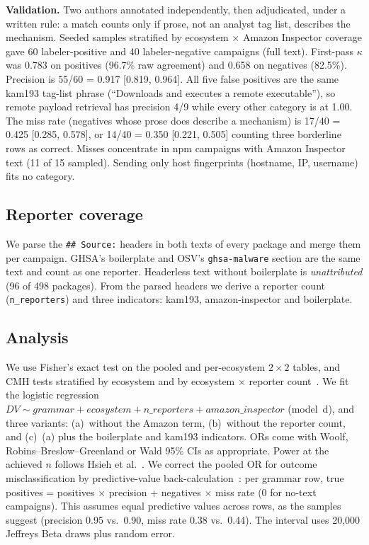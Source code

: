 \documentclass[10pt,conference]{IEEEtran}
\begin{document}
\textbf{Validation.} Two authors annotated independently, then adjudicated,
under a written rule: a match counts only if prose, not an analyst tag
list, describes the mechanism. Seeded samples stratified by ecosystem
$\times$ Amazon Inspector coverage gave 60 labeler-positive and 40
labeler-negative campaigns (full text). First-pass $\kappa$ was 0.783 on
positives (96.7\% raw agreement) and 0.658 on negatives (82.5\%). Precision is 55/60 = 0.917 [0.819, 0.964]. All five
false positives are the same kam193 tag-list phrase (``Downloads and
executes a remote executable''), so remote payload retrieval has precision
4/9 while every other category is at 1.00. The miss rate (negatives whose prose
does describe a mechanism) is 17/40 = 0.425 [0.285, 0.578], or 14/40 =
0.350 [0.221, 0.505] counting three borderline rows as correct. Misses
concentrate in npm campaigns with Amazon Inspector text (11 of 15 sampled).
Sending only host fingerprints (hostname, IP, username) fits no category.

\subsection{Reporter coverage}
We parse the \texttt{\#\# Source:} headers in both texts of every package
and merge them per campaign. GHSA's boilerplate and OSV's
\texttt{ghsa-malware} section are the same text and count as one reporter.
Headerless text without boilerplate is \emph{unattributed} (96 of 498
packages). From the parsed headers we derive a reporter count
(\texttt{n\_reporters}) and three indicators: kam193, amazon-inspector and
boilerplate.

\subsection{Analysis}
\label{sec:analysis}
We use Fisher's exact test on the pooled and per-ecosystem $2\times2$
tables, and CMH tests stratified by ecosystem and by ecosystem $\times$
reporter count~\cite{agresti}. We fit the logistic regression
$\mathit{DV} \sim \mathit{grammar} + \mathit{ecosystem} +
\mathit{n\_reporters} + \mathit{amazon\_inspector}$ (model~d), and three
variants: (a)~without the Amazon term, (b)~without the reporter count, and
(c)~(a) plus the boilerplate and kam193 indicators. ORs come with Woolf,
Robins--Breslow--Greenland or Wald 95\% CIs as appropriate. Power at the
achieved $n$ follows Hsieh et al.~\cite{hsieh1998}. We correct the pooled OR
for outcome misclassification by predictive-value
back-calculation~\cite{lash2009}: per grammar row, true positives =
positives $\times$ precision + negatives $\times$ miss rate (0 for
no-text campaigns). This assumes equal predictive values across rows, as
the samples suggest (precision 0.95 vs.\ 0.90, miss rate 0.38 vs.\ 0.44).
The interval uses 20,000 Jeffreys Beta draws plus random error.
\end{document}
